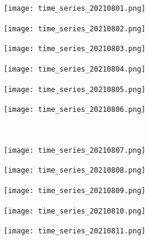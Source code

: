 \documentclass[10pt]{article}
\begin{document}
\begin{figure}[!h]
    \centering
    \begin{subfigure}[b]{0.166\linewidth}
        \centering
        \texttt{[image: time\_series\_20210801.png]}
    \end{subfigure}%
        \begin{subfigure}[b]{0.166\linewidth}
        \centering
        \texttt{[image: time\_series\_20210802.png]}
    \end{subfigure}%
    \begin{subfigure}[b]{0.166\linewidth}
        \centering
        \texttt{[image: time\_series\_20210803.png]}
    \end{subfigure}%
    \begin{subfigure}[b]{0.166\linewidth}
        \centering
        \texttt{[image: time\_series\_20210804.png]}
    \end{subfigure}%
    \begin{subfigure}[b]{0.166\linewidth}
        \centering
        \texttt{[image: time\_series\_20210805.png]}
    \end{subfigure}%
    \begin{subfigure}[b]{0.166\linewidth}
        \centering
        \texttt{[image: time\_series\_20210806.png]}
    \end{subfigure}
    \\
        \begin{subfigure}[b]{0.166\linewidth}
        \centering
        \texttt{[image: time\_series\_20210807.png]}
    \end{subfigure}%
    \begin{subfigure}[b]{0.166\linewidth}
        \centering
        \texttt{[image: time\_series\_20210808.png]}
    \end{subfigure}%
    \begin{subfigure}[b]{0.166\linewidth}
        \centering
        \texttt{[image: time\_series\_20210809.png]}
    \end{subfigure}%
    \begin{subfigure}[b]{0.166\linewidth}
        \centering
        \texttt{[image: time\_series\_20210810.png]}
    \end{subfigure}%
    \begin{subfigure}[b]{0.166\linewidth}
        \centering
        \texttt{[image: time\_series\_20210811.png]}

\end{subfigure}
\end{figure}
\end{document}
